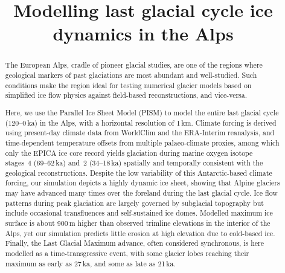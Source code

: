 \documentclass[tc, manuscript]{copernicus}
\title{Modelling last glacial cycle ice dynamics in the Alps}
\affil[1]{Laboratory of Hydraulics, Hydrology and Glaciology,
          ETH Zürich, Switzerland}
\affil[2]{Laboratory of Ion Beam Physics, ETH Zürich, Switzerland}
\affil[3]{Institute of Earth and Environmental Sciences,
          University of Freiburg, Germany}
\begin{document}


\maketitle

\begin{abstract}

    The European Alps, cradle of pioneer glacial studies, are one of the
    regions where geological markers of past glaciations are most abundant and
    well-studied. Such conditions make the region ideal for testing numerical
    glacier models based on simplified ice flow physics against field-based
    reconstructions, and vice-versa.

    Here, we use the Parallel Ice Sheet Model (PISM) to model the entire last
    glacial cycle (120--0\,ka) in the Alps, with a horizontal resolution of
    1\,km. Climate forcing is derived using present-day climate data from
    WorldClim and the ERA-Interim reanalysis, and time-dependent temperature
    offsets from multiple palaeo-climate proxies, among which only the EPICA ice
    core record yields glaciation during marine oxygen isotope stages~4
    (69--62\,ka) and~2 (34--18\,ka) spatially and temporally consistent with
    the geological reconstructions.
    Despite the low variability of this Antarctic-based climate forcing, our
    simulation depicts a highly dynamic ice sheet, showing that Alpine glaciers
    may have advanced many times over the foreland during the last glacial
    cycle. Ice flow patterns during peak glaciation are largely governed by
    subglacial topography but include occasional transfluences and
    self-sustained ice domes. Modelled maximum ice surface is about 900\,m
    higher than observed trimline elevations in the interior of the Alps, yet
    our simulation predicts little erosion at high elevation due to cold-based
    ice. Finally, the Last
    Glacial Maximum advance, often considered synchronous, is here modelled as
    a time-transgressive event, with some glacier lobes reaching their maximum
    as early as 27\,ka, and some as late as 21\,ka.

\end{abstract}



\introduction
\label{sec:intro}
\end{document}
